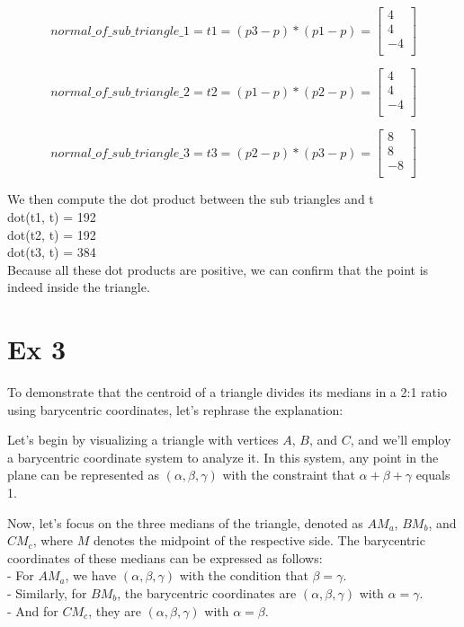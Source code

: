 \documentclass{article}
\begin{document}
\[
    normal\_of\_sub\_triangle\_1 = t1 = (p3 - p) * (p1 - p) =
    \begin{bmatrix}
        4  \\
        4  \\
        -4 \\
    \end{bmatrix}
\]

\[
    normal\_of\_sub\_triangle\_2 = t2 = (p1 - p) * (p2 - p) =
    \begin{bmatrix}
        4  \\
        4  \\
        -4 \\
    \end{bmatrix}
\]


\[
    normal\_of\_sub\_triangle\_3 = t3 = (p2 - p) * (p3 - p) =
    \begin{bmatrix}
        8  \\
        8  \\
        -8 \\
    \end{bmatrix}
\]




We then compute the dot product between the sub triangles and t
\\
dot(t1, t) = 192 \\
dot(t2, t) = 192 \\
dot(t3, t) = 384 \\
Because all these dot products are positive, we can confirm that the point is indeed inside the triangle.




\cleardoublepage
\section*{Ex 3}



To demonstrate that the centroid of a triangle divides its medians in a 2:1 ratio using barycentric coordinates, let's rephrase the explanation:

Let's begin by visualizing a triangle with vertices $A$, $B$, and $C$, and we'll employ a barycentric coordinate system to analyze it. In this system, any point in the plane can be represented as $(\alpha, \beta, \gamma)$ with the constraint that $\alpha + \beta + \gamma$ equals 1.

Now, let's focus on the three medians of the triangle, denoted as $AM_a$, $BM_b$, and $CM_c$, where $M$ denotes the midpoint of the respective side. The barycentric coordinates of these medians can be expressed as follows:
\\
- For $AM_a$, we have $(\alpha, \beta, \gamma)$ with the condition that $\beta = \gamma$. \\
- Similarly, for $BM_b$, the barycentric coordinates are $(\alpha, \beta, \gamma)$ with $\alpha = \gamma$. \\
- And for $CM_c$, they are $(\alpha, \beta, \gamma)$ with $\alpha = \beta$. \\
\end{document}
